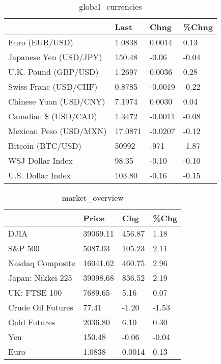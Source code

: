 \documentclass{article}%
\begin{document}
%


\begin{table}[htbp]%
\caption{global\_currencies}%
\centering%
\begin{adjustbox}{width=1\textwidth}%
\begin{tabular}{llll}
\toprule
                       &    Last &    Chng & \%Chng \\
\midrule
        Euro (EUR/USD) &  1.0838 &  0.0014 &  0.13 \\
Japanese Yen (USD/JPY) &  150.48 &   -0.06 & -0.04 \\
  U.K. Pound (GBP/USD) &  1.2697 &  0.0036 &  0.28 \\
 Swiss Franc (USD/CHF) &  0.8785 & -0.0019 & -0.22 \\
Chinese Yuan (USD/CNY) &  7.1974 &  0.0030 &  0.04 \\
  Canadian \$ (USD/CAD) &  1.3472 & -0.0011 & -0.08 \\
Mexican Peso (USD/MXN) & 17.0871 & -0.0207 & -0.12 \\
     Bitcoin (BTC/USD) &   50992 &    -971 & -1.87 \\
      WSJ Dollar Index &   98.35 &   -0.10 & -0.10 \\
     U.S. Dollar Index &  103.80 &   -0.16 & -0.15 \\
\bottomrule
\end{tabular}
%
\end{adjustbox}%
\end{table}

%


\begin{table}[htbp]%
\caption{market\_overview}%
\centering%
\begin{adjustbox}{width=1\textwidth}%
\begin{tabular}{llll}
\toprule
                  &    Price &    Chg &  \%Chg \\
\midrule
             DJIA & 39069.11 & 456.87 &  1.18 \\
          S\&P 500 &  5087.03 & 105.23 &  2.11 \\
 Nasdaq Composite & 16041.62 & 460.75 &  2.96 \\
Japan: Nikkei 225 & 39098.68 & 836.52 &  2.19 \\
     UK: FTSE 100 &  7689.65 &   5.16 &  0.07 \\
Crude Oil Futures &    77.41 &  -1.20 & -1.53 \\
     Gold Futures &  2036.80 &   6.10 &  0.30 \\
              Yen &   150.48 &  -0.06 & -0.04 \\
             Euro &   1.0838 & 0.0014 &  0.13 \\
\bottomrule
\end{tabular}
%
\end{adjustbox}%
\end{table}

%
\end{document}
